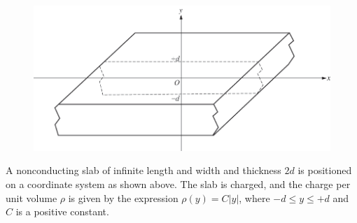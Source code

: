 %
\begin{figure}[H]
\centering
\includegraphics[scale=0.5]{images/img-016-035.png}
\end{figure}



\question
A nonconducting slab of infinite length and width and thickness $2 d$ is positioned on a coordinate system as shown above. The slab is charged, and the charge per unit volume $\rho$ is given by the expression $\rho(y)=C|y|$, where $-d \leq y \leq+d$ and $C$ is a positive constant. %

